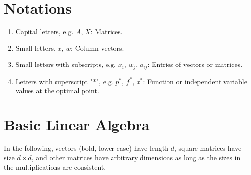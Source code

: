 \documentclass[11pt]{article}
\begin{document}
\thispagestyle{empty}
\noindent

\bigskip



\section{Notations}
\begin{enumerate}[label=(\alph*)]
\item Capital letters, e.g. $A$, $X$: Matrices.
\item Small letters, $x$, $w$: Column vectors.
\item Small letters with subscripts, e.g. $x_i$, $w_j$, $a_{ij}$: Entries of vectors or matrices. 
\item Letters with superscript "*", e.g. $p^{*}$, $f^{*}$, $x^{*}$: Function or independent variable values at the optimal point.

\end{enumerate}

\section{Basic Linear Algebra}

In the following, vectors (bold, lower-case) have length $d$, square matrices have size $d \times d$, and other matrices have arbitrary dimensions as long as the sizes in the multiplications are consistent.
\end{document}
